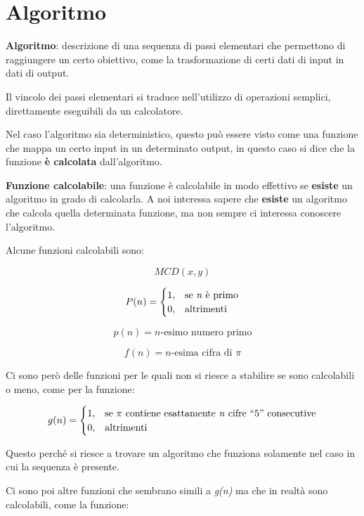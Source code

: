 
\section{Algoritmo}\label{algoritmo}

\textbf{Algoritmo}: descrizione di una sequenza di passi elementari che
permettono di raggiungere un certo obiettivo, come la trasformazione di
certi dati di input in dati di output. 

Il vincolo dei passi elementari
si traduce nell'utilizzo di operazioni semplici, direttamente eseguibili
da un calcolatore. 

Nel caso l'algoritmo sia deterministico, questo può
essere visto come una funzione che mappa un certo input in un
determinato output, in questo caso si dice che la funzione \textbf{è
calcolata} dall'algoritmo.

\textbf{Funzione calcolabile}: una funzione è calcolabile in modo
effettivo se \textbf{esiste} un algoritmo in grado di calcolarla. 
A noi interessa sapere che \textbf{esiste} un algoritmo che calcola quella
determinata funzione, ma non sempre ci interessa conoscere l'algoritmo.

Alcune funzioni calcolabili sono:

$$ MCD(x,y) $$

$$
P(n) = \begin{cases}
1, &\text{se \textit{n} è primo} \\
0, &\text{altrimenti}
\end{cases}
$$

$$ p(n) = n\text{-esimo numero primo}$$

$$ f(n) = n\text{-esima cifra di }\pi$$

Ci sono però delle funzioni per le quali non si riesce a stabilire se sono calcolabili o meno, come per la funzione:

$$
g(n) = \begin{cases}
1, &\text{se $\pi$ contiene esattamente \textit{n} cifre ``5'' consecutive} \\
0, &\text{altrimenti}
\end{cases}
$$

Questo perché si riesce a trovare un algoritmo che funziona solamente nel caso in cui la sequenza è presente.

Ci sono poi altre funzioni che sembrano simili a \textit{g(n)} ma che in realtà sono calcolabili, come la funzione:

